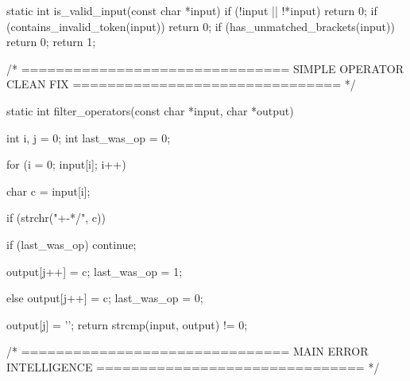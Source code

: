 \documentclass{article}
\begin{document}
static int is_valid_input(const char *input)
{
    if (!input || !*input) return 0;
    if (contains_invalid_token(input)) return 0;
    if (has_unmatched_brackets(input)) return 0;
    return 1;
}

/* ===============================
   SIMPLE OPERATOR CLEAN FIX
   =============================== */

static int filter_operators(const char *input, char *output)
{
    int i, j = 0;
    int last_was_op = 0;

    for (i = 0; input[i]; i++)
    {
        char c = input[i];

        if (strchr("+-*/", c))
        {
            if (last_was_op) continue;

            output[j++] = c;
            last_was_op = 1;
        }
        else
        {
            output[j++] = c;
            last_was_op = 0;
        }
    }

    output[j] = '\0';
    return strcmp(input, output) != 0;
}

/* ===============================
   MAIN ERROR INTELLIGENCE
   =============================== */
\end{document}
